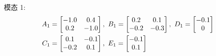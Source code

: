 	模态 1:
	\begin{equation} \notag
	\begin{aligned}
	A_{1} &= \begin{bmatrix}
	-1.0&0.4\\
	0.2&-1.0
	\end{bmatrix}, \ 
	B_{1} = \begin{bmatrix}
	0.2&0.1\\ -0.2&-0.3
	\end{bmatrix} ,\ 
	D_{1} = \begin{bmatrix}
	-0.1\\0
	\end{bmatrix} \\
	C_{1} &= \begin{bmatrix}
	0.1&-0.1\\-0.2&0.1
	\end{bmatrix},\ 
	E_{1} = \begin{bmatrix}
	-0.1\\ 0.1
	\end{bmatrix}
	\end{aligned}  
	\end{equation}
	
